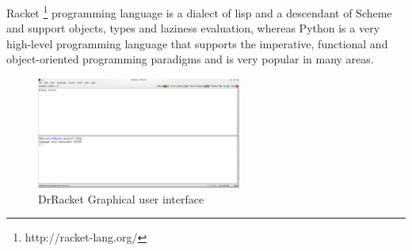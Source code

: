 Racket \footnote{http://racket-lang.org/} programming language is a dialect of lisp and a descendant of Scheme and support objects, types and laziness evaluation,
whereas Python is a very high-level programming language that supports the imperative, functional and object-oriented programming paradigms and is very popular in many areas.




\begin{figure}[htbp]
	\centering
	\includegraphics[width=0.6\textwidth]{img/DrRacketGui.png}
	\caption{DrRacket Graphical user interface}
	\label{fig:DrRacketGui}
\end{figure}




